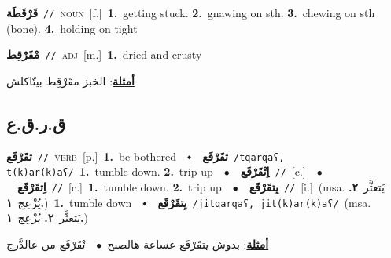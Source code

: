 \documentclass[10pt,a4paper,twoside]{article} %
\begin{document}
\begin{multicols}{2}
{\setlength\topsep{0pt}\textbf{\foreignlanguage{arabic}{قَرْقَطَة}}\ {\color{gray}\texttt{//}\color{black}}\ \textsc{noun}\ [f.]\ \textbf{1.}~getting stuck.  \textbf{2.}~gnawing on sth.  \textbf{3.}~chewing on sth (bone).  \textbf{4.}~holding on tight\ } \vspace{2mm}

{\setlength\topsep{0pt}\textbf{\foreignlanguage{arabic}{مْقَرْقِط}}\ {\color{gray}\texttt{//}\color{black}}\ \textsc{adj}\ [m.]\ \textbf{1.}~dried and crusty\  \begin{flushright}\color{gray}\foreignlanguage{arabic}{\textbf{\underline{\foreignlanguage{arabic}{أمثلة}}}: الخبز مقَرْقِط بيتّاكلش}\end{flushright}\color{black}} \vspace{2mm}

\vspace{-3mm}
\subsection*{\color{blue}\foreignlanguage{arabic}{ق.ر.ق.ع}\color{blue}{}} 

{\setlength\topsep{0pt}\textbf{\foreignlanguage{arabic}{تقَرْقَع}}\ {\color{gray}\texttt{//}\color{black}}\ \textsc{verb}\ [p.]\ \textbf{1.}~be bothered\ \ $\smblkdiamond$\ \ \setlength\topsep{0pt}\textbf{\foreignlanguage{arabic}{تقَرْقَع}}\ {\color{gray}\texttt{/tqarqaʕ, t(k)ar(k)aʕ/}\color{black}}\ \textbf{1.}~tumble down.  \textbf{2.}~trip up\ \ $\bullet$\ \ \setlength\topsep{0pt}\textbf{\foreignlanguage{arabic}{اِتْقَرْقَع}}\ {\color{gray}\texttt{//}\color{black}}\ [c.]\ \ $\bullet$\ \ \setlength\topsep{0pt}\textbf{\foreignlanguage{arabic}{اِتقَرْقَع}}\ {\color{gray}\texttt{//}\color{black}}\ [c.]\ \textbf{1.}~tumble down.  \textbf{2.}~trip up\ \ $\bullet$\ \ \setlength\topsep{0pt}\textbf{\foreignlanguage{arabic}{يِتقَرْقَع}}\ {\color{gray}\texttt{//}\color{black}}\ [i.]\ \color{gray}(msa. \foreignlanguage{arabic}{يَتعثَّر}~\foreignlanguage{arabic}{\textbf{٢.}}  \foreignlanguage{arabic}{يُزْعِج}~\foreignlanguage{arabic}{\textbf{١.}})\color{black}\ \textbf{1.}~tumble down\ \ $\smblkdiamond$\ \ \setlength\topsep{0pt}\textbf{\foreignlanguage{arabic}{يِتقَرْقَع}}\ {\color{gray}\texttt{/jitqarqaʕ, jit(k)ar(k)aʕ/}\color{black}}\ \color{gray}(msa. \foreignlanguage{arabic}{يَتعثَّر}~\foreignlanguage{arabic}{\textbf{٢.}}  \foreignlanguage{arabic}{يُزْعِج}~\foreignlanguage{arabic}{\textbf{١.}})\color{black}\  \begin{flushright}\color{gray}\foreignlanguage{arabic}{\textbf{\underline{\foreignlanguage{arabic}{أمثلة}}}: بدوش يتقَرْقَع عساعة هالصبح\ $\bullet$\ \  تْقَرْقَع من عالدَّرج}\end{flushright}\color{black}} \vspace{2mm}


\end{multicols}
\end{document}
